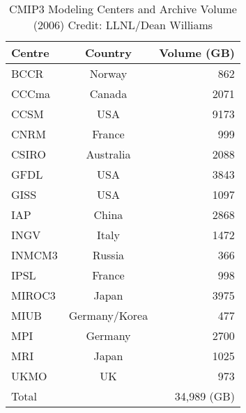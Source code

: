 \begin{table}[]
	\small
	\centering
	\begin{tabular}{  l | c | r  }
		Centre & Country       & Volume (GB) \\ \hline\hline
		BCCR   & Norway        & 862         \\ %
		CCCma  & Canada        & 2071        \\ %
		CCSM   & USA           & 9173        \\ %
		CNRM   & France        & 999         \\ %
		CSIRO  & Australia     & 2088        \\ %
		GFDL   & USA           & 3843        \\ %
		GISS   & USA           & 1097        \\ %
		IAP    & China         & 2868        \\ %
		INGV   & Italy         & 1472        \\ %
		INMCM3 & Russia        & 366         \\ %
		IPSL   & France        & 998         \\ %
		MIROC3 & Japan         & 3975        \\ %
		MIUB   & Germany/Korea & 477         \\ %
		MPI    & Germany       & 2700        \\ %
		MRI    & Japan         & 1025        \\ %
		UKMO   & UK            & 973         \\ \hline
		Total  &               & 34,989 (GB) \\ %
	\end{tabular}
  \caption{CMIP3 Modeling Centers and Archive Volume (2006) Credit: LLNL/Dean Williams}
  \label{tab:CMIP3_data_volume}
\end{table}


